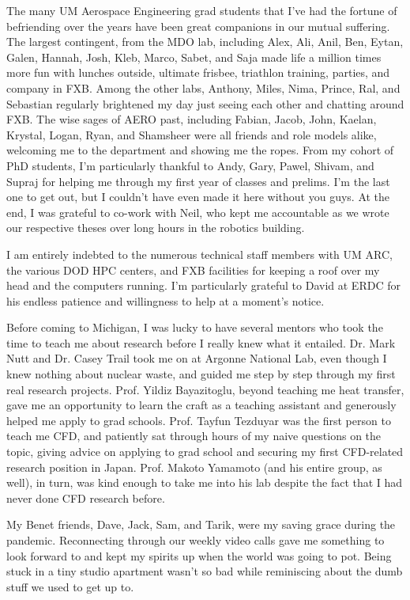 The many UM Aerospace Engineering grad students that I've had the fortune of befriending over the years have been great companions in our mutual suffering. The largest contingent, from the MDO lab, including Alex, Ali, Anil, Ben, Eytan, Galen, Hannah, Josh, Kleb, Marco, Sabet, and Saja made life a million times more fun with lunches outside, ultimate frisbee, triathlon training, parties, and company in FXB. Among the other labs, Anthony, Miles, Nima, Prince, Ral, and Sebastian regularly brightened my day just seeing each other and chatting around FXB. The wise sages of AERO past, including Fabian, Jacob, John, Kaelan, Krystal, Logan, Ryan, and Shamsheer were all friends and role models alike, welcoming me to the department and showing me the ropes. From my cohort of PhD students, I'm particularly thankful to Andy, Gary, Pawel, Shivam, and Supraj for helping me through my first year of classes and prelims. I'm the last one to get out, but I couldn't have even made it here without you guys. At the end, I was grateful to co-work with Neil, who kept me accountable as we wrote our respective theses over long hours in the robotics building. 

I am entirely indebted to the numerous technical staff members with UM ARC, the various DOD HPC centers, and FXB facilities for keeping a roof over my head and the computers running. I'm particularly grateful to David at ERDC for his endless patience and willingness to help at a moment's notice.

Before coming to Michigan, I was lucky to have several mentors who took the time to teach me about research before I really knew what it entailed. Dr. Mark Nutt and Dr. Casey Trail took me on at Argonne National Lab, even though I knew nothing about nuclear waste, and guided me step by step through my first real research projects. Prof. Yildiz Bayazitoglu, beyond teaching me heat transfer, gave me an opportunity to learn the craft as a teaching assistant and generously helped me apply to grad schools. Prof. Tayfun Tezduyar was the first person to teach me CFD, and patiently sat through hours of my naive questions on the topic, giving advice on applying to grad school and securing my first CFD-related research position in Japan. Prof. Makoto Yamamoto (and his entire group, as well), in turn, was kind enough to take me into his lab despite the fact that I had never done CFD research before.

My Benet friends, Dave, Jack, Sam, and Tarik, were my saving grace during the pandemic. Reconnecting through our weekly video calls gave me something to look forward to and kept my spirits up when the world was going to pot. Being stuck in a tiny studio apartment wasn't so bad while reminiscing about the dumb stuff we used to get up to.

